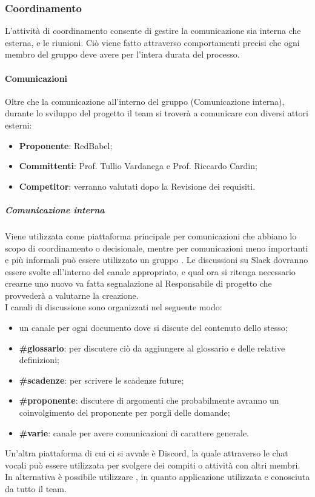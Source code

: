 \subsubsection{Coordinamento} \label{_gestioneDiProcesso_coordinamento}
L'attività di coordinamento consente di gestire la comunicazione sia interna che esterna, e le riunioni. Ciò viene fatto attraverso comportamenti precisi che ogni membro del gruppo deve avere per l'intera durata del processo.

\paragraph{Comunicazioni}
Oltre che la comunicazione all'interno del gruppo (Comunicazione interna), durante lo sviluppo del progetto il team si troverà a comunicare con diversi attori esterni:
\begin{itemize}
    \item \textbf{Proponente}: RedBabel;
    \item \textbf{Committenti}: Prof. Tullio Vardanega e Prof. Riccardo Cardin;
    \item \textbf{Competitor}: verranno valutati dopo la Revisione dei requisiti.
\end{itemize}

\subparagraph{Comunicazione interna}
Viene utilizzata come piattaforma principale  per comunicazioni che abbiano lo scopo di coordinamento o decisionale, mentre per comunicazioni meno importanti e più informali può essere utilizzato un gruppo .
Le discussioni su Slack dovranno essere svolte all'interno del canale appropriato, e qual ora si ritenga necessario crearne uno nuovo va fatta segnalazione al Responsabile di progetto che provvederà a valutarne la creazione.\\
I canali di discussione sono organizzati nel seguente modo:
\begin{itemize}
    \item un canale per ogni documento dove si discute del contenuto dello stesso;
    \item \textbf{\#glossario}: per discutere ciò da aggiungere al glossario e delle relative definizioni;
    \item \textbf{\#scadenze}: per scrivere le scadenze future;
    \item \textbf{\#proponente}: discutere di argomenti che probabilmente avranno un coinvolgimento del proponente per porgli delle domande;
    \item \textbf{\#varie}: canale per avere comunicazioni di carattere generale.
\end{itemize}
Un'altra piattaforma di cui ci si avvale è Discord, la quale attraverso le chat vocali può essere utilizzata per svolgere dei compiti o attività con altri membri. In alternativa è possibile utilizzare , in quanto applicazione utilizzata e conosciuta da tutto il team.

